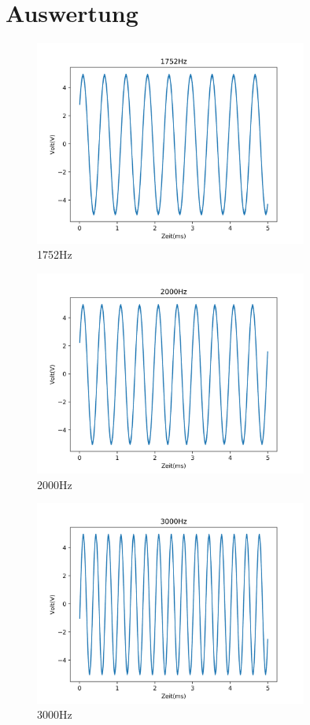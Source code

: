 \documentclass[12pt, oneside, a4paper, \docLanguage]{report}
\begin{document}
\section{Auswertung}
\label{chap:VERSUCH_5_AUSWERTUNG}
\begin{figure}[H]
	\centering
	\includegraphics[width=0.8\textwidth]{../Images/1752Hz.png}
	\caption{1752Hz}
\end{figure}
\begin{figure}[H]
	\centering
	\includegraphics[width=0.8\textwidth]{../Images/2000Hz.png}
	\caption{2000Hz}
\end{figure}
\begin{figure}[H]
	\centering
	\includegraphics[width=0.8\textwidth]{../Images/3000Hz.png}
	\caption{3000Hz}
\end{figure}
\end{document}
